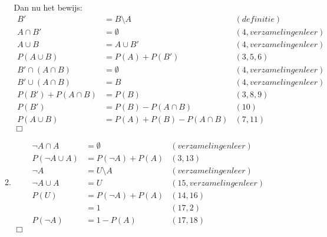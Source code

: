 \documentclass{article}
\begin{document}
\begin{enumerate}
\begin{enumerate}
                Dan nu het bewijs:
                \begin{align}
                    B' &= B\setminus A & (definitie)\\
                    A \cap B' &= \emptyset & (4, verzamelingenleer)\\
                    A \cup B &= A \cup B' & (4, verzamelingenleer)\\
                    P(A\cup B) &= P(A) + P(B') & (3, 5, 6)\\
                    B' \cap (A \cap B) &= \emptyset & (4, verzamelingenleer)\\
                    B' \cup (A\cap B) &= B & (4, verzamelingenleer)\\
                    P(B') + P(A \cap B) &= P(B) & (3, 8, 9)\\
                    P(B') &= P(B) - P(A\cap B) & (10)\\
                    P(A\cup B) &= P(A) + P(B) - P(A\cap B) & (7, 11)
                \end{align}
                $\Box$

            \item
                \begin{align}
                    \lnot A \cap A &= \emptyset & (verzamelingenleer)\\
                    P(\lnot A \cup A) &= P(\lnot A) + P(A) & (3, 13)\\
                    \lnot A &= U\setminus A & (verzamelingenleer)\\
                    \lnot A \cup A &= U & (15, verzamelingenleer)\\
                    P(U) &= P(\lnot A) + P(A) & (14, 16)\\
                         &= 1 & (17, 2)\\
                    P(\lnot A) &= 1 - P(A) & (17, 18)
                \end{align}
                $\Box$


\end{enumerate}
\end{enumerate}
\end{document}

